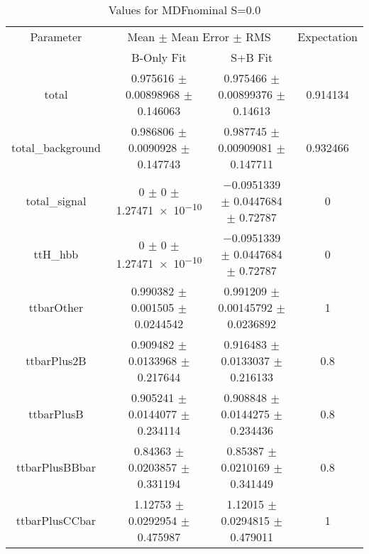 \begin{table}
\centering
\caption{Values for MDFnominal S=0.0}
\begin{tabular}{cccc}
\toprule
Parameter & \multicolumn{2}{c}{Mean $\pm$ Mean Error $\pm$ RMS} & Expectation\\
 & B-Only Fit & S+B Fit & \\
\midrule
total & \num{0.975616} $\pm$ \num{0.00898968} $\pm$ \num{0.146063} & \num{0.975466} $\pm$ \num{0.00899376} $\pm$ \num{0.14613} & \num{0.914134}\\
total\_background & \num{0.986806} $\pm$ \num{0.0090928} $\pm$ \num{0.147743} & \num{0.987745} $\pm$ \num{0.00909081} $\pm$ \num{0.147711} & \num{0.932466}\\
total\_signal & \num{0} $\pm$ \num{0} $\pm$ \num{1.27471e-10} & \num{-0.0951339} $\pm$ \num{0.0447684} $\pm$ \num{0.72787} & \num{0}\\
ttH\_hbb & \num{0} $\pm$ \num{0} $\pm$ \num{1.27471e-10} & \num{-0.0951339} $\pm$ \num{0.0447684} $\pm$ \num{0.72787} & \num{0}\\
ttbarOther & \num{0.990382} $\pm$ \num{0.001505} $\pm$ \num{0.0244542} & \num{0.991209} $\pm$ \num{0.00145792} $\pm$ \num{0.0236892} & \num{1}\\
ttbarPlus2B & \num{0.909482} $\pm$ \num{0.0133968} $\pm$ \num{0.217644} & \num{0.916483} $\pm$ \num{0.0133037} $\pm$ \num{0.216133} & \num{0.8}\\
ttbarPlusB & \num{0.905241} $\pm$ \num{0.0144077} $\pm$ \num{0.234114} & \num{0.908848} $\pm$ \num{0.0144275} $\pm$ \num{0.234436} & \num{0.8}\\
ttbarPlusBBbar & \num{0.84363} $\pm$ \num{0.0203857} $\pm$ \num{0.331194} & \num{0.85387} $\pm$ \num{0.0210169} $\pm$ \num{0.341449} & \num{0.8}\\
ttbarPlusCCbar & \num{1.12753} $\pm$ \num{0.0292954} $\pm$ \num{0.475987} & \num{1.12015} $\pm$ \num{0.0294815} $\pm$ \num{0.479011} & \num{1}\\
\bottomrule
\end{tabular}
\end{table}